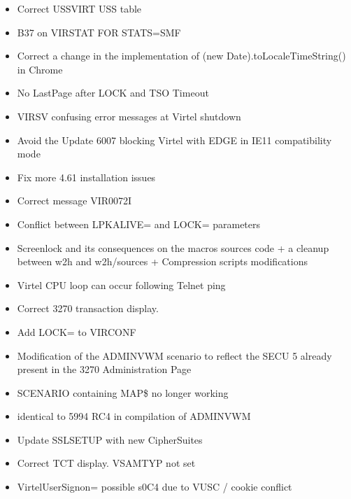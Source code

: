\documentclass[letterpaper,10pt,english]{sphinxmanual}
\begin{document}
\begin{itemize}
\item {} 
 Correct USSVIRT USS table

\item {} 
 B37 on VIRSTAT  FOR STATS=SMF

\item {} 
 Correct a change in the implementation of (new Date).toLocaleTimeString() in Chrome

\item {} 
 No LastPage after LOCK and TSO Timeout

\item {} 
 VIRSV confusing error messages at Virtel shutdown

\item {} 
 Avoid the Update 6007 blocking Virtel with EDGE in IE11 compatibility mode

\item {} 
 Fix more 4.61 installation issues

\item {} 
 Correct message VIR0072I

\item {} 
 Conflict between LPKALIVE= and LOCK= parameters

\item {} 
 Screenlock and its consequences on the macros sources code + a cleanup between w2h and w2h/sources + Compression scripts modifications

\item {} 
 Virtel CPU loop can occur following Telnet ping

\item {} 
 Correct 3270 transaction display.

\item {} 
 Add LOCK= to VIRCONF

\item {} 
 Modification of the ADMINVWM scenario to reflect the SECU 5 already present in the 3270 Administration Page

\item {} 
 SCENARIO containing MAP\$ no longer working

\item {} 
 identical to 5994 RC4 in compilation of ADMINVWM

\item {} 
 Update SSLSETUP with new CipherSuites

\item {} 
 Correct TCT display. VSAMTYP not set

\item {} 
 VirtelUserSignon= possible s0C4 due to VUSC / cookie conflict

\end{itemize}



\renewcommand{\indexname}{Index}
\printindex
\end{document}
